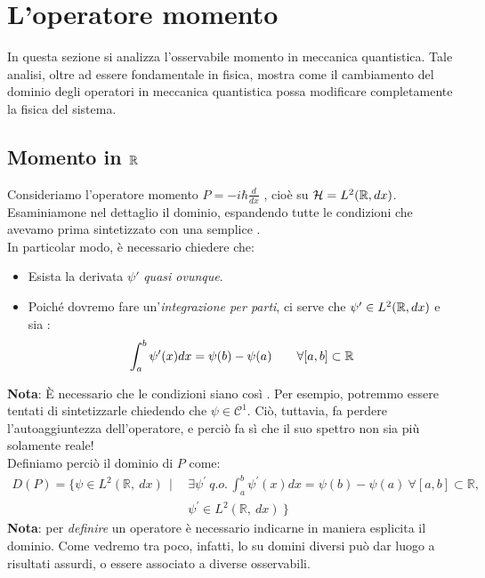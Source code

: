 \documentclass[../../FisicaTeorica.tex]{subfiles}
\begin{document}
\section{L'operatore momento}
In questa sezione si analizza l'osservabile momento in meccanica quantistica. Tale analisi, oltre ad essere fondamentale in fisica, mostra come il cambiamento del dominio degli operatori in meccanica quantistica possa modificare completamente la fisica del sistema.
\subsection{Momento in $\mathbb{R}$}
Consideriamo l'operatore momento $P=-i\hbar \frac{d}{dx}$ , cioè su $\mathcal{H} = L^2(\bm{\mathbb{R}}, dx)$. Esaminiamone nel dettaglio il dominio, espandendo tutte le condizioni che avevamo prima sintetizzato con una semplice .\\
In particolar modo, è necessario chiedere che:
\begin{itemize}
    \item Esista la derivata $\psi'$ \textit{quasi ovunque}.
    \item Poiché dovremo fare un'\textit{integrazione per parti}, ci serve che $\psi' \in L^2(\mathbb{R}, dx)$ e sia :
    \[
    \int_a^b \psi'(x)dx = \psi(b)-\psi(a) \qquad \forall [a,b] \subset \mathbb{R}
    \]
\end{itemize}
\textbf{Nota}: È necessario che le condizioni siano così . Per esempio, potremmo essere tentati di sintetizzarle chiedendo che $\psi \in \mathcal C^1$. Ciò, tuttavia, fa perdere l'autoaggiuntezza dell'operatore, e perciò fa sì che il suo spettro non sia più solamente reale!\\
Definiamo perciò il dominio di $P$ come:
\begin{align*}
D\left(P\right)= \big\{\psi\in L^2\left(\mathbb{R},\ dx\right)\ \ |\ \ 
&\exists\psi^\prime\ q.o.\, \int_{a}^{b}{\psi^\prime\left(x\right)dx}=\psi\left(b\right)-\psi\left(a\right)\ \forall\left[a,b\right]\subset\mathbb{R},\\
&\psi^\prime\in L^2(\mathbb{R},\ dx)\ \big\}
\end{align*}
\textbf{Nota}: per \textit{definire} un operatore è necessario indicarne in maniera esplicita il dominio. Come vedremo tra poco, infatti, lo  su domini diversi può dar luogo a risultati assurdi, o essere associato a diverse osservabili.\\
\end{document}

